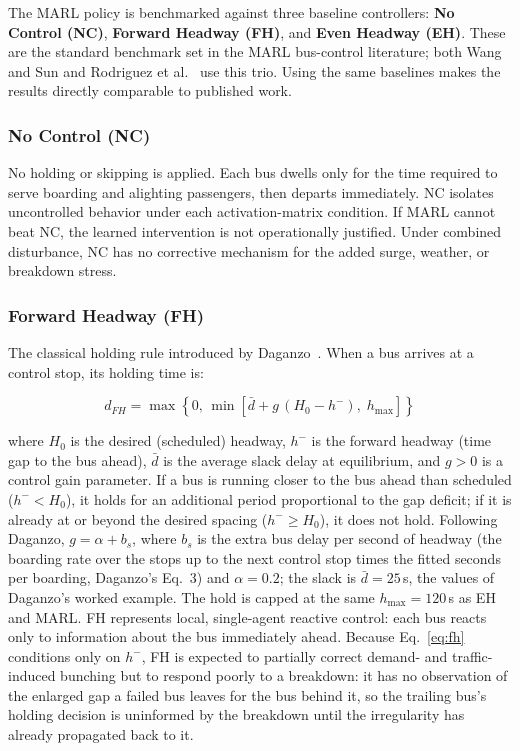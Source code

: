 The MARL policy is benchmarked against three baseline controllers: \textbf{No Control (NC)}, \textbf{Forward Headway (FH)}, and \textbf{Even Headway (EH)}. These are the standard benchmark set in the MARL bus-control literature; both Wang and Sun \cite{Wangsun} and Rodriguez et al.~\cite{Rodriguez2023Cooperative} use this trio. Using the same baselines makes the results directly comparable to published work.

\subsubsection{No Control (NC)}

No holding or skipping is applied. Each bus dwells only for the time required to serve boarding and alighting passengers, then departs immediately. NC isolates uncontrolled behavior under each activation-matrix condition. If MARL cannot beat NC, the learned intervention is not operationally justified. Under combined disturbance, NC has no corrective mechanism for the added surge, weather, or breakdown stress.

\subsubsection{Forward Headway (FH)}

The classical holding rule introduced by Daganzo~\cite{Daganzo2009}. When a bus arrives at a control stop, its holding time is:

\begin{equation}
d_{FH} = \max\!\left\{0,\, \min\!\left[\bar{d} + g\,(H_0 - h^-),\; h_{\max}\right]\right\}
\label{eq:fh}
\end{equation}

where $H_0$ is the desired (scheduled) headway, $h^-$ is the forward headway (time gap to the bus ahead), $\bar{d}$ is the average slack delay at equilibrium, and $g > 0$ is a control gain parameter. If a bus is running closer to the bus ahead than scheduled ($h^- < H_0$), it holds for an additional period proportional to the gap deficit; if it is already at or beyond the desired spacing ($h^- \geq H_0$), it does not hold. Following Daganzo, $g = \alpha + b_s$, where $b_s$ is the extra bus delay per second of headway (the boarding rate over the stops up to the next control stop times the fitted seconds per boarding, Daganzo's Eq.~3) and $\alpha = 0.2$; the slack is $\bar{d} = 25$\,s, the values of Daganzo's worked example. The hold is capped at the same $h_{\max} = 120$\,s as EH and MARL. FH represents local, single-agent reactive control: each bus reacts only to information about the bus immediately ahead. Because Eq.~\eqref{eq:fh} conditions only on $h^-$, FH is expected to partially correct demand- and traffic-induced bunching but to respond poorly to a breakdown: it has no observation of the enlarged gap a failed bus leaves for the bus behind it, so the trailing bus's holding decision is uninformed by the breakdown until the irregularity has already propagated back to it.

